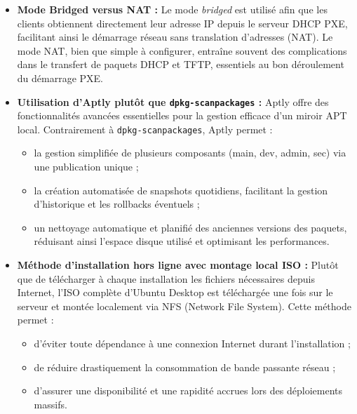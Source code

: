\documentclass[a4paper,12pt]{article}
\begin{document}
\begin{itemize}

\item \textbf{Mode Bridged versus NAT :} 
Le mode \textit{bridged} est utilisé afin que les clients obtiennent directement leur adresse IP depuis le serveur DHCP PXE, facilitant ainsi le démarrage réseau sans translation d’adresses (NAT). Le mode NAT, bien que simple à configurer, entraîne souvent des complications dans le transfert de paquets DHCP et TFTP, essentiels au bon déroulement du démarrage PXE.

\item \textbf{Utilisation d’Aptly plutôt que \texttt{dpkg-scanpackages} :} 
Aptly offre des fonctionnalités avancées essentielles pour la gestion efficace d'un miroir APT local. Contrairement à \texttt{dpkg-scanpackages}, Aptly permet :
\begin{itemize}
    \item la gestion simplifiée de plusieurs composants (main, dev, admin, sec) via une publication unique ;
    \item la création automatisée de snapshots quotidiens, facilitant la gestion d'historique et les rollbacks éventuels ;
    \item un nettoyage automatique et planifié des anciennes versions des paquets, réduisant ainsi l'espace disque utilisé et optimisant les performances.
\end{itemize}

\item \textbf{Méthode d'installation hors ligne avec montage local ISO :} 
Plutôt que de télécharger à chaque installation les fichiers nécessaires depuis Internet, l’ISO complète d'Ubuntu Desktop est téléchargée une fois sur le serveur et montée localement via NFS (Network File System). Cette méthode permet :
\begin{itemize}
    \item d'éviter toute dépendance à une connexion Internet durant l'installation ;
    \item de réduire drastiquement la consommation de bande passante réseau ;
    \item d'assurer une disponibilité et une rapidité accrues lors des déploiements massifs.
\end{itemize}


\end{itemize}
\end{document}
